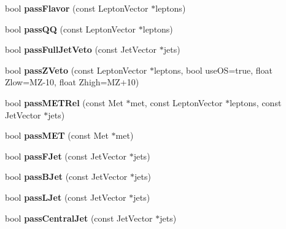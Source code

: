 \begin{DoxyCompactItemize}
\item 
\hypertarget{classSusySelection_a522e8adad0bdcc52cf5d6f8b90ef8bf3}{
bool {\bfseries passFlavor} (const LeptonVector $\ast$leptons)}
\label{classSusySelection_a522e8adad0bdcc52cf5d6f8b90ef8bf3}

\item 
\hypertarget{classSusySelection_acddc0a4aa16ce6c3a116a13996d1d27c}{
bool {\bfseries passQQ} (const LeptonVector $\ast$leptons)}
\label{classSusySelection_acddc0a4aa16ce6c3a116a13996d1d27c}

\item 
\hypertarget{classSusySelection_a5c191b0005e0461f380081b75abd8fc6}{
bool {\bfseries passFullJetVeto} (const JetVector $\ast$jets)}
\label{classSusySelection_a5c191b0005e0461f380081b75abd8fc6}

\item 
\hypertarget{classSusySelection_a7e5c74cf10b72af89ccc7d4c17f461e8}{
bool {\bfseries passZVeto} (const LeptonVector $\ast$leptons, bool useOS=true, float Zlow=MZ-\/10, float Zhigh=MZ+10)}
\label{classSusySelection_a7e5c74cf10b72af89ccc7d4c17f461e8}

\item 
\hypertarget{classSusySelection_a9c154466e051070d29510b0c78f4aa78}{
bool {\bfseries passMETRel} (const Met $\ast$met, const LeptonVector $\ast$leptons, const JetVector $\ast$jets)}
\label{classSusySelection_a9c154466e051070d29510b0c78f4aa78}

\item 
\hypertarget{classSusySelection_a5f41d29778b214ae2e8e9ae25e744163}{
bool {\bfseries passMET} (const Met $\ast$met)}
\label{classSusySelection_a5f41d29778b214ae2e8e9ae25e744163}

\item 
\hypertarget{classSusySelection_a4b1029ab2c2f6a0b0c73bb7197b424c9}{
bool {\bfseries passFJet} (const JetVector $\ast$jets)}
\label{classSusySelection_a4b1029ab2c2f6a0b0c73bb7197b424c9}

\item 
\hypertarget{classSusySelection_a008450c31f3409af1244c4ac0ed4c1ce}{
bool {\bfseries passBJet} (const JetVector $\ast$jets)}
\label{classSusySelection_a008450c31f3409af1244c4ac0ed4c1ce}

\item 
\hypertarget{classSusySelection_afb40e9bde35fff7abe9a9499e052405b}{
bool {\bfseries passLJet} (const JetVector $\ast$jets)}
\label{classSusySelection_afb40e9bde35fff7abe9a9499e052405b}

\item 
\hypertarget{classSusySelection_a935740bc99ee7d8be2e7af978f1df2bc}{
bool {\bfseries passCentralJet} (const JetVector $\ast$jets)}
\label{classSusySelection_a935740bc99ee7d8be2e7af978f1df2bc}


\end{DoxyCompactItemize}
